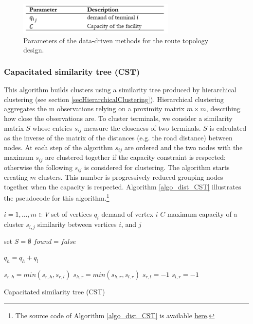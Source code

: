\begin{figure}[hbt!]
\centering
\includegraphics[width=0.7\textwidth]{SectionDistribution/design_figures/tab_nodeClustering.png}
\captionsetup{type=table}
\caption{Parameters of the data-driven methods for the route topology design.}
\label{tab_nodeClustering}
\end{figure}

\subsubsection{Capacitated similarity tree (CST)}
This algorithm builds clusters using a similarity tree produced by hierarchical clustering (see section \ref{secHierarchicalClustering}). Hierarchical clustering aggregates the m observations relying on a proximity matrix $m \times m$, describing how close the observations are. To cluster terminals, we consider a similarity matrix $S$ whose entries $s_{ij}$ measure the closeness of two terminals. $S$ is calculated as the inverse of the matrix of the distances (e.g. the road distance) between nodes. At each step of the algorithm $s_{ij}$ are ordered and the two nodes with the maximum $s_{ij}$ are clustered together if the capacity constraint is respected; otherwise the following $s_{ij}$ is considered for clustering. The algorithm starts creating $m$ clusters. This number is progressively reduced grouping nodes together when the capacity is respected. Algorithm \ref{algo_dist_CST} illustrates the pseudocode for this algorithm.\footnote{The source code of Algorithm \ref{algo_dist_CST} is available \href{https://github.com/aletuf93/logproj/blob/master/logproj/ml_unsupervised_models.py}{here}.} 

\begin{algorithm}[H]
\DontPrintSemicolon
\SetAlgoLined

$i = 1,...,m \in V$ set of vertices\;
$q_i$ demand of vertex $i$\;
$C$ maximum capacity of a cluster \;
$s_{i,j}$ similarity between vertices $i$, and $j$ \;
{
set $S=\emptyset$\;
$found=false$\;

$q_h=q_h+q_l$\;
{
$s_{r,h}=min(s_{r,h},s_{r,l})$\;
$s_{h,r}=min(s_{h,r},s_{l,r})$\;
$s_{r,l}=-1$\;
$s_{l,r}=-1$\;

}
}

\caption{Capacitated similarity tree (CST)}
\label{algo_dist_CST}   
    

\end{algorithm}

